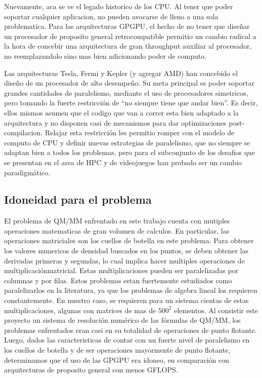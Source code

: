 Nuevamente, aca se ve el legado historico de los CPU. Al tener que poder soportar cualquier aplicacion, no pueden
avocarse de lleno a una sola problematica. Para las arquitecturas GPGPU, el hecho de no tener que dise\~nar un
procesador de proposito general retrocompatible permitio un cambio radical a la hora de concebir
una arquitectura de gran throughput auxiliar al procesador, no reemplazandolo sino mas bien adicionando poder de computo.~\cite{GlaskowskyFermi}

Las arquitecturas Tesla, Fermi y Kepler (y agregar AMD) han concebido el dise\~no de un procesador de alto desempe\~no.
Su meta principal es poder soportar grandes cantidades de paralelismo, mediante el uso de procesadores
simetricos, pero tomando la fuerte restricci\'on de ``no siempre tiene que andar bien''. Es decir, ellos
mismos asumen que el codigo que van a correr esta bien adaptado a la arquitectura y no disponen
casi de mecanismos para dar optimizaciones post-compilacion. Relajar esta restricci\'on
les permitio romper con el modelo de computo de CPU y definir nuevas estrategias de paralelismo,
que no siempre se adaptan bien a todos los problemas, pero para el subconjunto de los desafios que se
presentan en el area de HPC y de videojuegos han probado ser un cambio paradigm\'atico.

\subsection{Idoneidad para el problema}
El problema de QM/MM enfrentado en este trabajo cuenta con mutiples operaciones matematicas de gran
volumen de calculos. En particular, las operaciones matriciales son los cuellos de botella en este
problema.
Para obtener los valores numericos de densidad buscados en los puntos, se deben obtener las derivadas primeras
y segundas, lo cual implica hacer multiples operaciones de multiplicaci\'onmatricial. Estas multiplicaciones
pueden ser paralelizadas por columnas y por filas. Estos problemas estan fuertemente estudiados como paralelizarlos
en la literatura, ya que los problemas de algebra lineal los requieren constantemente.
En nuestro caso, se requieren para un sistema cientas de estas multiplicaciones, algunas con matrices de mas de
$500^2$ elementos. Al consistir este proyecto un sistema de resoluci\'on num\'erico de las f\'ormulas de QM/MM,
los problemas enfrentados eran casi en su totalidad de operaciones de punto flotante. Luego, dados las
caracteristicas de contar con un fuerte nivel de paralelismo en los cuellos de botella y de ser operaciones
mayormente de punto flotante, determinamos que el uso de las GPGPU era idoneo, en comparaci\'on con arquitecturas
de proposito general con menos GFLOPS.

